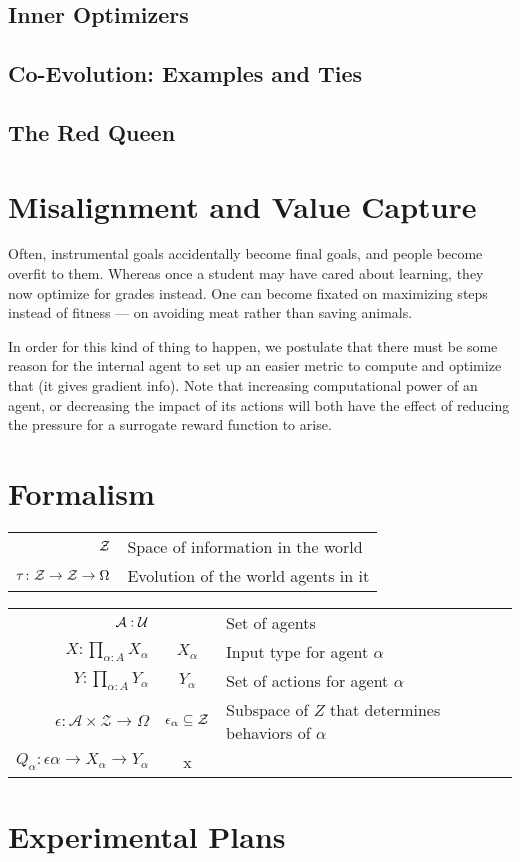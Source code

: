 \documentclass{article}
\theoremstyle{definition}
\newcommand{\Z}{\mathcal Z}
\begin{document}
	\subsection{Inner Optimizers}
	\subsection{Co-Evolution: Examples and Ties}
	\subsection{The Red Queen}
	
	\section{Misalignment and Value Capture}
	Often, instrumental goals accidentally become final goals, and people become overfit to them. Whereas once a student may have cared about learning, they now optimize for grades instead. One can become fixated on maximizing steps instead of fitness --- on avoiding meat rather than saving animals. 
	
	In order for this kind of thing to happen, we postulate that there must be some reason for the internal agent to set up an easier metric to compute and optimize that (it gives gradient info). Note that increasing computational power of an agent, or decreasing the impact of its actions will both have the effect of reducing the pressure for a surrogate reward function to arise. 
	
	
	\section{Formalism}%
	
	\begin{tabular}{r|l}
		$\cal Z$ & Space of information in the world \\
		$\tau\colon {\cal Z \to Z} \to \Omega$ & Evolution of the world agents in it \\
	\end{tabular}
	\vspace{1em}
	
	
	\begin{tabular}{r|c|l}		
		$\cal A : U$ && Set of agents \\[0.3em]
		$\displaystyle X\colon \prod_{\alpha: A} X_\alpha$ & $X_\alpha$ & Input type for agent $\alpha$ \\[1.7em]
		$\displaystyle Y\colon \prod_{\alpha: A} Y_\alpha$ &$Y_\alpha$ & Set of actions for agent $\alpha$ \\
		$\displaystyle \epsilon\colon \mathcal A \times \Z \to \Omega $&$\epsilon_\alpha \subseteq \cal Z$ & Subspace of $Z$ that determines behaviors of $\alpha$ \\
		$Q_\alpha\colon \epsilon\alpha \to X_\alpha \to Y_\alpha$ & x 
	\end{tabular}

	\section{Experimental Plans}
	
\end{document}
